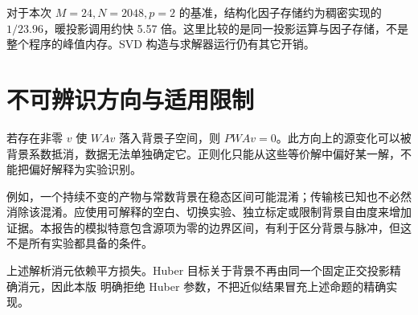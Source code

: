 对于本次 $M=24,N=2048,p=2$ 的基准，结构化因子存储约为稠密实现的 $1/23.96$，暖投影调用约快 5.57 倍。这里比较的是同一投影运算与因子存储，不是整个程序的峰值内存。SVD 构造与求解器运行仍有其它开销。

\section{不可辨识方向与适用限制}
若存在非零 $v$ 使 $WAv$ 落入背景子空间，则 $PWAv=0$。此方向上的源变化可以被背景系数抵消，数据无法单独确定它。正则化只能从这些等价解中偏好某一解，不能把偏好解释为实验识别。

例如，一个持续不变的产物与常数背景在稳态区间可能混淆；传输核已知也不必然消除该混淆。应使用可解释的空白、切换实验、独立标定或限制背景自由度来增加证据。本报告的模拟特意包含源项为零的边界区间，有利于区分背景与脉冲，但这不是所有实验都具备的条件。

上述解析消元依赖平方损失。Huber 目标关于背景不再由同一个固定正交投影精确消元，因此本版  明确拒绝 Huber 参数，不把近似结果冒充上述命题的精确实现。
